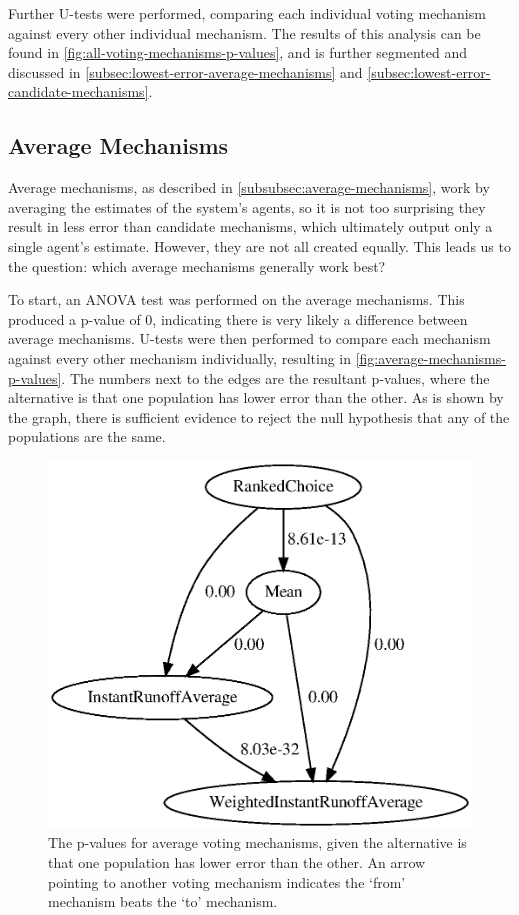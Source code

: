 Further U-tests were performed, comparing each individual voting mechanism against
every other individual mechanism.
The results of this analysis can be found in
\autoref{fig:all-voting-mechanisms-p-values}, and is further segmented and discussed in
\autoref{subsec:lowest-error-average-mechanisms} and
\autoref{subsec:lowest-error-candidate-mechanisms}.

\subsection{Average Mechanisms}\label{subsec:lowest-error-average-mechanisms}
Average mechanisms, as described in \autoref{subsubsec:average-mechanisms}, work by
averaging the estimates of the system's agents, so it is not too surprising they
result in less error than candidate mechanisms, which ultimately output only a single
agent's estimate.
However, they are not all created equally.
This leads us to the question: which average mechanisms generally work best?

To start, an ANOVA test was performed on the average mechanisms.
This produced a p-value of 0, indicating there is very likely a difference between
average mechanisms.
U-tests were then performed to compare each mechanism against every other
mechanism individually, resulting in \autoref{fig:average-mechanisms-p-values}.
The numbers next to the edges are the resultant p-values, where the alternative is
that one population has lower error than the other.
As is shown by the graph, there is sufficient evidence to reject the null hypothesis
that any of the populations are the same.

\begin{figure}[htbp]
    \centering
    \includegraphics[scale=0.75]
    {./content/figures/voting_mechanisms/average-mechanisms-p-values.gv}
    \caption{The p-values for average voting mechanisms, given the alternative is
    that one population has lower error than the other.
    An arrow pointing to another voting mechanism indicates the `from' mechanism
    beats the `to' mechanism.}
    \label{fig:average-mechanisms-p-values}
\end{figure}


